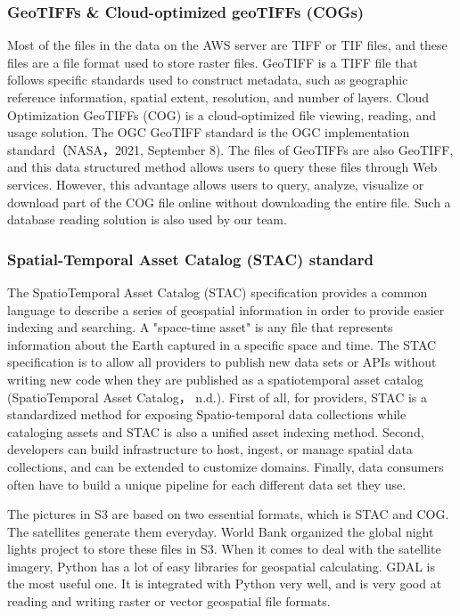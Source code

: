 \documentclass[conference]{IEEEtran}
\begin{document}
\subsubsection{GeoTIFFs & Cloud-optimized geoTIFFs (COGs)}
Most of the files in the data on the AWS server are TIFF or TIF files, and these files are a file format used to store raster files. GeoTIFF is a TIFF file that follows specific standards used to construct metadata, such as geographic reference information, spatial extent, resolution, and number of layers.
Cloud Optimization GeoTIFFs (COG) is a cloud-optimized file viewing, reading, and usage solution. The OGC GeoTIFF standard is the OGC implementation standard（NASA，2021, September 8). The files of GeoTIFFs are also GeoTIFF, and this data structured method allows users to query these files through Web services. However, this advantage allows users to query, analyze, visualize or download part of the COG file online without downloading the entire file. Such a database reading solution is also used by our team.

\subsubsection{Spatial-Temporal Asset Catalog (STAC) standard}
The SpatioTemporal Asset Catalog (STAC) specification provides a common language to describe a series of geospatial information in order to provide easier indexing and searching. A "space-time asset" is any file that represents information about the Earth captured in a specific space and time. The STAC specification is to allow all providers to publish new data sets or APIs without writing new code when they are published as a spatiotemporal asset catalog (SpatioTemporal Asset Catalog， n.d.). First of all, for providers, STAC is a standardized method for exposing Spatio-temporal data collections while cataloging assets and STAC is also a unified asset indexing method. Second, developers can build infrastructure to host, ingest, or manage spatial data collections, and can be extended to customize domains. Finally, data consumers often have to build a unique pipeline for each different data set they use.



The pictures in S3 are based on two essential formats, which is STAC and COG. The satellites generate them everyday. World Bank organized the global night lights project 
to store these files in S3. When it comes to deal with the satellite imagery, Python has a lot of easy libraries for geospatial calculating. GDAL is the most useful one. 
It is integrated with Python very well, and is very good at reading and writing raster or vector geospatial file formats.
\end{document}
